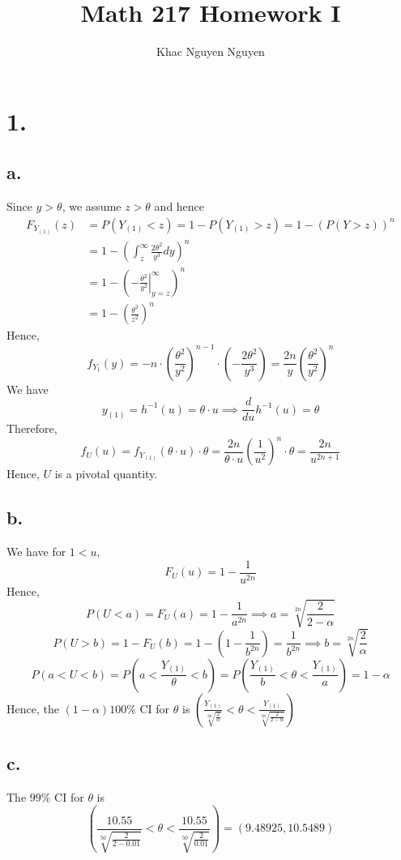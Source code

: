 \documentclass[11pt]{article}
\title{\textbf{Math 217 Homework I}}
\author{Khac Nguyen Nguyen}
\date{}
\begin{document}
\section*{1.}
\subsection*{a.}
Since $y> \theta$, we assume $z > \theta$ and hence
\begin{equation*}
    \begin{aligned}
        F_{Y_{(1)}}(z) &= P(Y_{(1)} < z) = 1 - P(Y_{(1)} > z) = 1 - \left(P(Y > z)\right)^n \\
        &= 1 - \left( \int_z^\infty \frac{2\theta^2}{y^3} dy \right)^n \\
        &= 1 - \left( \left. -\frac{\theta^2}{y^2} \right|_{y=z}^\infty \right)^n \\
        &= 1 - \left(\frac{\theta^2}{z^2} \right)^n
    \end{aligned}
\end{equation*}
Hence, 
\[
    f_{Y_{1}}(y) = - n \cdot \left( \frac{\theta^2}{y^2} \right)^{n-1} \cdot \left(-\frac{2\theta^2}{y^3} \right) = \frac{2n}{y} \left( \frac{\theta^2}{y^2} \right)^n    
\]
We have 
\[
    y_{(1)} =h^{-1}(u) = \theta \cdot u \implies \frac{d}{du}h^{-1}(u) = \theta
\]
Therefore, 
\[
    f_U(u) = f_{Y_{(1)}}(\theta \cdot u) \cdot \theta = \frac{2n}{\theta \cdot u} \left(\frac{1}{u^2}\right)^n \cdot \theta = \frac{2n}{u^{2n+1}}
\]
Hence, $U$ is a pivotal quantity.
\subsection*{b.}
We have for $1<u$,
\[
    F_U(u) = 1 - \frac{1}{u^{2n}}    
\]
Hence, 
\[
    P(U < a) = F_U(a) =  1 - \frac{1}{a^{2n}} \implies a = \sqrt[2n]{\frac{2}{2-\alpha}} 
\]
\[
    P(U > b) = 1 - F_U(b) = 1 - \left(1-\frac{1}{b^{2n}}\right) = \frac{1}{b^{2n}} \implies b = \sqrt[2n]{\frac{2}{\alpha}}   
\]
\[
    P(a<U<b) = P\left(a < \frac{Y_{(1)}}{\theta} < b\right) = P\left(\frac{Y_{(1)}}{b} < \theta < \frac{Y_{(1)}}{a} \right) = 1- \alpha    
\]
Hence, the $(1-\alpha)100\%$ CI for $\theta$ is $\left( \frac{Y_{(1)}}{\sqrt[2n]{\frac{2}{\alpha}}} < \theta < \frac{Y_{(1)}}{\sqrt[2n]{\frac{2}{2-\alpha}} } \right)$
\subsection*{c.}
The $99\%$ CI for $\theta$ is 
\[
    \left( \frac{10.55}{\sqrt[50]{\frac{2}{2-0.01}} } < \theta < \frac{10.55}{\sqrt[50]{\frac{2}{0.01}}} \right) = \left(9.48925, 10.5489 \right) 
\]
\end{document}
